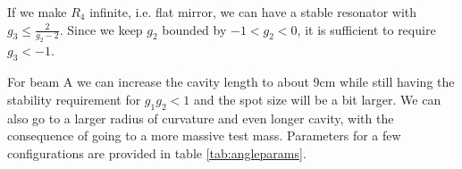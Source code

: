 If we make $R_4$ infinite, i.e. flat mirror, we can have a stable resonator
with $g_3 \leq \frac{2}{g_2 - 2}$.
Since we keep $g_2$ bounded by $-1 < g_2 < 0$, it is sufficient to require
$g_3 < -1$.

For beam A we can increase the cavity length to about 9cm while still having
the stability requirement for $g_1g_2<1$ and the spot size will be a bit
larger.
We can also go to a larger radius of curvature and even longer cavity, with
the consequence of going to a more massive test mass.
Parameters for a few configurations are provided in table \ref{tab:angleparams}.


\newcommand{\um}{\mathrm{m}}
\newcommand{\uhz}{\mathrm{Hz}}

